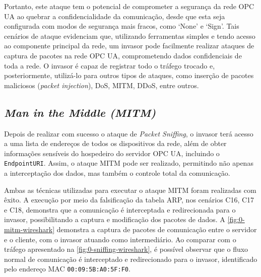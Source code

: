         Portanto, este ataque tem o potencial de comprometer a segurança da rede OPC UA ao quebrar a confidencialidade da comunicação, desde que esta seja configurada com modos de segurança mais fracos, como `None' e `Sign'. Tais cenários de ataque evidenciam que, utilizando ferramentas simples e tendo acesso ao componente principal da rede, um invasor pode facilmente realizar ataques de captura de pacotes na rede OPC UA, comprometendo dados confidenciais de toda a rede. O invasor é capaz de registrar todo o tráfego trocado e, posteriormente, utilizá-lo para outros tipos de ataques, como inserção de pacotes maliciosos (\textit{packet injection}), DoS, MITM, DDoS, entre outros.

    \subsection{\textit{Man in the Middle (MITM)}}

        Depois de realizar com sucesso o ataque de \textit{Packet Sniffing}, o invasor terá acesso a uma lista de endereços de todos os dispositivos da rede, além de obter informações sensíveis do hospedeiro do servidor OPC UA, incluindo o \texttt{EndpointURI}. Assim, o ataque MITM pode ser realizado, permitindo não apenas a interceptação dos dados, mas também o controle total da comunicação.

        Ambas as técnicas utilizadas para executar o ataque MITM foram realizadas com êxito. A execução por meio da falsificação da tabela ARP, nos cenários C16, C17 e C18, demonstra que a comunicação é interceptada e redirecionada para o invasor, possibilitando a captura e modificação dos pacotes de dados. A \autoref{fig:0-mitm-wireshark} demonstra a captura de pacotes de comunicação entre o servidor e o cliente, com o invasor atuando como intermediário. Ao comparar com o tráfego apresentado na \autoref{fig:0-sniffing-wireshark}, é possível observar que o fluxo normal de comunicação é interceptado e redirecionado para o invasor, identificado pelo endereço MAC \texttt{00:09:5B:A0:5F:F0}.

